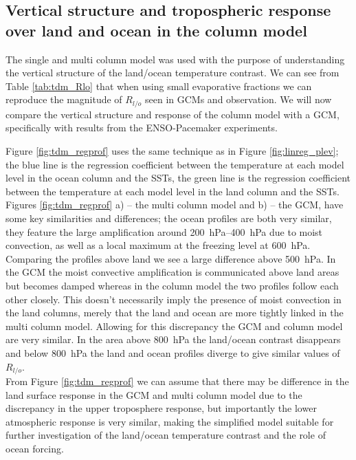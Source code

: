 \subsection{Vertical structure and tropospheric response over land and ocean in 
the column model}

The single and multi column model was used with the purpose of understanding the 
vertical structure of the land/ocean temperature contrast. We can see from Table 
\ref{tab:tdm_Rlo} that when using small evaporative fractions we can reproduce 
the magnitude of $R_{l/o}$ seen in GCMs and observation. We will now compare the 
vertical structure and response of the column model with a GCM, specifically 
with results from the ENSO-Pacemaker experiments.  

Figure \ref{fig:tdm_regprof} uses the same technique as in Figure 
\ref{fig:linreg_plev}; the blue line is the regression coefficient between the 
temperature at each model level in the ocean column and the SSTs, the green line 
is the regression coefficient between the temperature at each model level in the 
land column and the SSTs. Figures \ref{fig:tdm_regprof} a) -- the multi column 
model and b) -- the GCM, have some key similarities and differences; the ocean 
profiles are both very similar, they feature the large amplification around 
\SIrange{200}{400}{\hecto\pascal} due to moist convection, as well as a local 
maximum at the freezing level at \SI{600}{\hecto\pascal}.  Comparing the 
profiles above land we see a large difference above \SI{500}{\hecto\pascal}. In 
the GCM the moist convective amplification is communicated above land areas but 
becomes damped whereas in the column model the two profiles follow each other 
closely.  This doesn't necessarily imply the presence of moist convection in the 
land columns, merely that the land and ocean are more tightly linked in the 
multi column model.  Allowing for this discrepancy the GCM and column model are 
very similar.  In the area above \SI{800}{\hecto\pascal} the land/ocean contrast 
disappears and below \SI{800}{\hecto\pascal} the land and ocean profiles diverge 
to give similar values of $R_{l/o}$.\\
From Figure \ref{fig:tdm_regprof} we can assume that there may be difference in 
the land surface response in the GCM and multi column model due to the 
discrepancy in the upper troposphere response, but importantly the lower 
atmospheric response is very similar, making the simplified model suitable for 
further investigation of the land/ocean temperature contrast and the role of 
ocean forcing.


